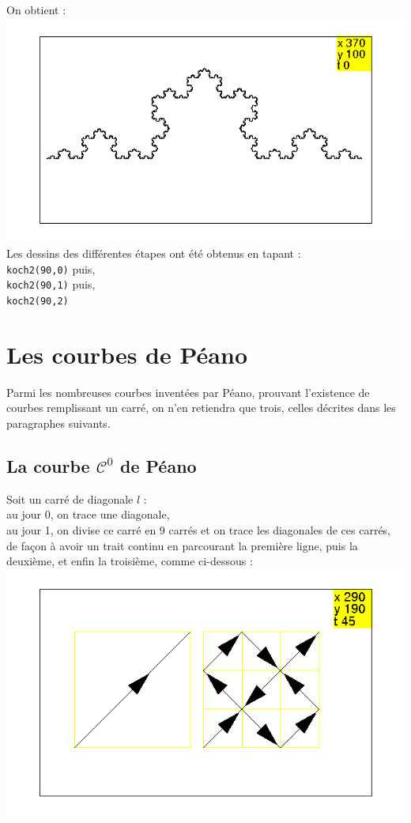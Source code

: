\documentclass[a4paper,11pt]{book}
\begin{document}
On obtient :\\
\includegraphics[width=\textwidth]{tortkoch2}\\
Les dessins des diff\'erentes \'etapes ont \'et\'e obtenus en tapant :\\
{\tt koch2(90,0)}  puis, \\
{\tt koch2(90,1)}  puis, \\
{\tt koch2(90,2)} \\

\section{Les courbes de P\'eano}
Parmi les nombreuses courbes invent\'ees par P\'eano, prouvant l'existence de 
courbes remplissant un carr\'e, on n'en retiendra que trois, celles d\'ecrites 
dans les paragraphes suivants.
\subsection{La courbe $\mathcal C^0$ de P\'eano}
Soit un carr\'e de diagonale $l$ :\\
au jour 0, on trace une diagonale,\\
au jour 1, on divise ce carr\'e en 9 carr\'es et on trace les diagonales de ces
 carr\'es, de fa\c{c}on \`a avoir un trait continu en parcourant la premi\`ere 
ligne, puis la deuxi\`eme, et enfin la troisi\`eme, comme ci-dessous :\\
%
\includegraphics[width=\textwidth]{tortpeano}\\
\end{document}
